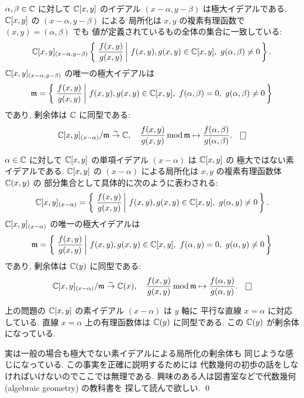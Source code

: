 \documentclass[12pt,twoside]{jarticle}
\begin{document}
\begin{question}
 $\alpha,\beta\in{\mathbb C}$ に対して %
 ${\mathbb C}[x,y]$ のイデアル $(x-\alpha,y-\beta)$ は極大イデアルである.
 ${\mathbb C}[x,y]$ の $(x-\alpha,y-\beta)$ による
 局所化は $x,y$ の複素有理函数で $(x,y)=(\alpha,\beta)$ でも
 値が定義されているもの全体の集合に一致している:
 \begin{equation*}
  {\mathbb C}[x,y]_{(x-\alpha,y-\beta)}
   \left\{\,\left. \frac{f(x,y)}{g(x,y)} 
   \,\right|\, f(x,y),g(x,y)\in{\mathbb C}[x,y],\ g(\alpha,\beta)\ne 0 \,\right\}.
 \end{equation*}
 ${\mathbb C}[x,y]_{(x-\alpha,y-\beta)}$ の唯一の極大イデアルは
 \begin{equation*}
  \frakm =
   \left\{\,\left. \frac{f(x,y)}{g(x,y)} 
   \,\right|\, f(x,y),g(x,y)\in\C[x,y],\ %
   f(\alpha,\beta)=0,\ g(\alpha,\beta)\ne 0 \,\right\}
 \end{equation*}
 であり, 剰余体は ${\mathbb C}$ に同型である:
 \begin{equation*}
  \C[x,y]_{(x-\alpha)}/\frakm \isomto \C, \quad
  \frac{f(x,y)}{g(x,y)}\MOD\frakm
  \mapsto \frac{f(\alpha,\beta)}{g(\alpha,\beta)}.
  \qed
 \end{equation*}
\end{question}

\begin{question}
 $\alpha\in{\mathbb C}$ に対して %
 ${\mathbb C}[x,y]$ の単項イデアル $(x-\alpha)$ は ${\mathbb C}[x,y]$ の
 極大ではない素イデアルである.
 ${\mathbb C}[x,y]$ の $(x-\alpha)$ による局所化は $x,y$ の複素有理函数体 ${\mathbb C}(x,y)$ の
 部分集合として具体的に次のように表わされる:
 \begin{equation*}
  {\mathbb C}[x,y]_{(x-\alpha)} =
   \left\{\,\left. \frac{f(x,y)}{g(x,y)} 
   \,\right|\, f(x,y),g(x,y)\in{\mathbb C}[x,y],\ g(\alpha,y)\ne 0 \,\right\}.
 \end{equation*}
 ${\mathbb C}[x,y]_{(x-\alpha)}$ の唯一の極大イデアルは
 \begin{equation*}
  \frakm =
   \left\{\,\left. \frac{f(x,y)}{g(x,y)} 
   \,\right|\, f(x,y),g(x,y)\in\C[x,y],\ %
   f(\alpha,y)=0,\ g(\alpha,y)\ne 0 \,\right\}
 \end{equation*}
 であり, 剰余体は ${\mathbb C}(y)$ に同型である:
 \begin{equation*}
  \C[x,y]_{(x-\alpha)}/\frakm \isomto \C(x),
  \quad
  \frac{f(x,y)}{g(x,y)} \MOD \frakm \mapsto \frac{f(\alpha,y)}{g(\alpha,y)}.
  \qed
 \end{equation*}
\end{question}

\begin{guide}
 上の問題の ${\mathbb C}[x,y]$ の素イデアル $(x-\alpha)$ は $y$ 軸に
 平行な直線 $x=\alpha$ に対応している. 
 直線 $x=\alpha$ 上の有理函数体は ${\mathbb C}(y)$ に同型である.
 この ${\mathbb C}(y)$ が剰余体になっている.

 実は一般の場合も極大でない素イデアルによる局所化の剰余体も
 同じような感じになっている.
 この事実を正確に説明するためには
 代数幾何の初歩の話をしなければいけないのでここでは無理である.
 興味のある人は図書室などで代数幾何 (algebraic geometry) の教科書を
 探して読んで欲しい.
 \qed
\end{guide}
\end{document}
